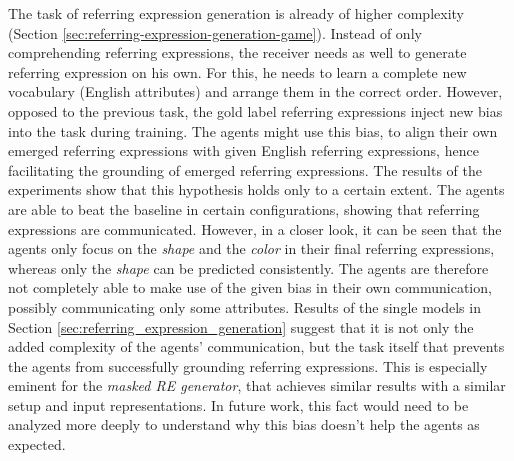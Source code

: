 The task of referring expression generation is already of higher complexity (Section \ref{sec:referring-expression-generation-game}).
Instead of only comprehending referring expressions, the receiver needs as well to generate referring expression on his own.
For this, he needs to learn a complete new vocabulary (English attributes) and arrange them in the correct order.
However, opposed to the previous task, the gold label referring expressions inject new bias into the task during training.
The agents might use this bias, to align their own emerged referring expressions with given English referring expressions, hence facilitating the grounding of emerged referring expressions.
The results of the experiments show that this hypothesis holds only to a certain extent.
The agents are able to beat the baseline in certain configurations, showing that referring expressions are communicated.
However, in a closer look, it can be seen that the agents only focus on the \emph{shape} and the \emph{color} in their final referring expressions, whereas only the \emph{shape} can be predicted consistently.
The agents are therefore not completely able to make use of the given bias in their own communication, possibly communicating only some attributes.
Results of the single models in Section \ref{sec:referring_expression_generation} suggest that it is not only the added complexity of the agents' communication, but the task itself that prevents the agents from successfully grounding referring expressions.
This is especially eminent for the \emph{masked RE generator}, that achieves similar results with a similar setup and input representations.
In future work, this fact would need to be analyzed more deeply to understand why this bias doesn't help the agents as expected.

